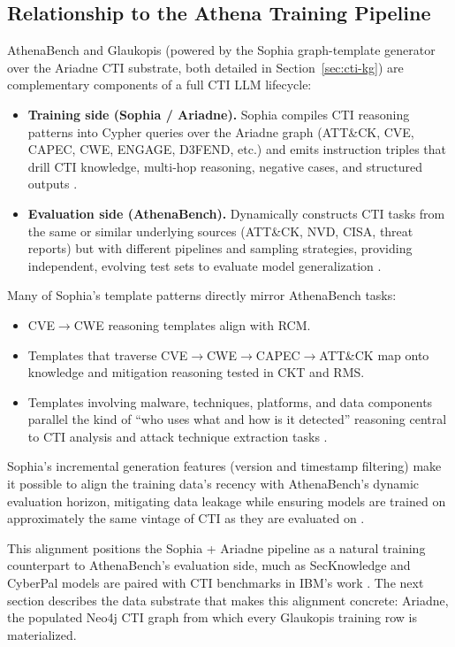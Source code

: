 \documentclass[unnumsec,webpdf,contemporary,large]{oup-authoring-template}
\theoremstyle{thmstyleone}
\theoremstyle{thmstyletwo}
\theoremstyle{thmstylethree}
\begin{document}
\subsection{Relationship to the Athena Training Pipeline}

AthenaBench and Glaukopis (powered by the Sophia graph-template generator over the Ariadne CTI substrate, both detailed in Section~\ref{sec:cti-kg}) are complementary components of a full CTI LLM lifecycle:

\begin{itemize}
  \item \textbf{Training side (Sophia / Ariadne).} Sophia compiles CTI reasoning patterns into Cypher queries over the Ariadne graph (ATT\&CK, CVE, CAPEC, CWE, ENGAGE, D3FEND, etc.) and emits instruction triples that drill CTI knowledge, multi-hop reasoning, negative cases, and structured outputs \cite{cardei2025ift}.
  \item \textbf{Evaluation side (AthenaBench).} Dynamically constructs CTI tasks from the same or similar underlying sources (ATT\&CK, NVD, CISA, threat reports) but with different pipelines and sampling strategies, providing independent, evolving test sets to evaluate model generalization \cite{alam2025athenabench}.
\end{itemize}

Many of Sophia's template patterns directly mirror AthenaBench tasks:
\begin{itemize}
  \item CVE$\rightarrow$CWE reasoning templates align with RCM.
  \item Templates that traverse CVE$\rightarrow$CWE$\rightarrow$CAPEC$\rightarrow$ATT\&CK map onto knowledge and mitigation reasoning tested in CKT and RMS.
  \item Templates involving malware, techniques, platforms, and data components parallel the kind of ``who uses what and how is it detected'' reasoning central to CTI analysis and attack technique extraction tasks \cite{cardei2025ift}.
\end{itemize}

Sophia's incremental generation features (version and timestamp filtering) make it possible to align the training data's recency with AthenaBench's dynamic evaluation horizon, mitigating data leakage while ensuring models are trained on approximately the same vintage of CTI as they are evaluated on \cite{cardei2025ift,alam2025athenabench}.

This alignment positions the Sophia + Ariadne pipeline as a natural training counterpart to AthenaBench's evaluation side, much as SecKnowledge and CyberPal models are paired with CTI benchmarks in IBM's work \cite{levi2024cyberpal,levi2025toward}. The next section describes the data substrate that makes this alignment concrete: Ariadne, the populated Neo4j CTI graph from which every Glaukopis training row is materialized.
\end{document}
